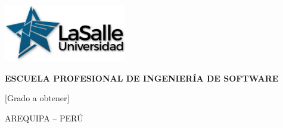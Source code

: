 \begin{titlepage}

    \includegraphics[width=0.4\textwidth]{imagenes/La Salle Logo.png}
    
        \begin{center}
            \vspace*{1cm}
            \large{\textbf{ESCUELA PROFESIONAL DE INGENIERÍA DE SOFTWARE}}
            
            
            \vspace{1.5cm}
            \makeatletter
            \large{\@title}
            \makeatother
            
            
            \vspace{1.5cm}
            \makeatletter
            \@author
            \makeatother
            
            \vspace{1.5cm}
            [Grado a obtener]
            
            \vfill
            
            AREQUIPA – PERÚ
            
            \vspace{0.5cm}
            \makeatletter
            \@date
            \makeatother
        \end{center}

\end{titlepage}